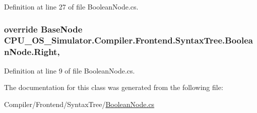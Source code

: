 Definition at line 27 of file Boolean\+Node.\+cs.

\hypertarget{class_c_p_u___o_s___simulator_1_1_compiler_1_1_frontend_1_1_syntax_tree_1_1_boolean_node_a3308cc287e781c949b529d6f1ad33254}{}
\subsubsection[{Right}]{\setlength{\rightskip}{0pt plus 5cm}override {\bf Base\+Node} C\+P\+U\+\_\+\+O\+S\+\_\+\+Simulator.\+Compiler.\+Frontend.\+Syntax\+Tree.\+Boolean\+Node.\+Right\hspace{0.3cm}{\ttfamily [get]}, {\ttfamily [set]}}\label{class_c_p_u___o_s___simulator_1_1_compiler_1_1_frontend_1_1_syntax_tree_1_1_boolean_node_a3308cc287e781c949b529d6f1ad33254}


Definition at line 9 of file Boolean\+Node.\+cs.



The documentation for this class was generated from the following file\+:\begin{DoxyCompactItemize}
\item 
Compiler/\+Frontend/\+Syntax\+Tree/\hyperlink{_boolean_node_8cs}{Boolean\+Node.\+cs}\end{DoxyCompactItemize}
